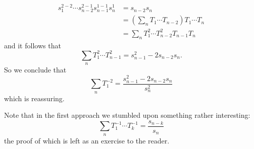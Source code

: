 \begin{sol}
\begin{enumerate}
            \begin{align*}
                s_1^{2-2}\cdots s_{n-2}^{2-1}s_{n-1}^{1-1}s_n^1&=s_{n-2}s_n\\
                &=\left(\sum_n T_1\cdots T_{n-2}\right)T_1\cdots T_n\\
                &=\sum_n T_1^2\cdots T_{n-2}^2 T_{n-1}T_n
            \end{align*}
            and it follows that
            $$\sum_n T_1^2\cdots T_{n-1}^2 = s_{n-1}^2-2s_{n-2}s_n.$$
            So we conclude that
            $$ \sum_n T_1^{-2} = \frac{s_{n-1}^2-2s_{n-2}s_n}{s_n^2}$$
            which is reassuring.
        \end{enumerate}
        Note that in the first approach we stumbled upon something rather interesting:
        $$
            \sum_n T_1^{-1}\cdots T_k^{-1} = \frac{s_{n-k}}{s_n}
        $$
        the proof of which is left as an exercise to the reader.
    \end{sol}

    \begin{ex}{14.24}
        
    \end{ex}


